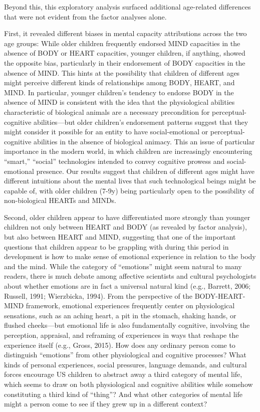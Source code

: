 \documentclass[10pt, letterpaper]{article}
\begin{document}
Beyond this, this exploratory analysis surfaced additional age-related
differences that were not evident from the factor analyses alone.

First, it revealed different biases in mental capacity attributions
across the two age groups: While older children frequently endorsed MIND
capacities in the absence of BODY or HEART capacities, younger children,
if anything, showed the opposite bias, particularly in their endorsement
of BODY capacities in the absence of MIND. This hints at the possibility
that children of different ages might perceive different kinds of
relationships among BODY, HEART, and MIND. In particular, younger
children's tendency to endorse BODY in the absence of MIND is consistent
with the idea that the physiological abilities characteristic of
biological animals are a necessary precondition for perceptual-cognitive
abilities---but older children's endorsement patterns suggest that they
might consider it possible for an entity to have social-emotional or
perceptual-cognitive abilities in the absence of biological animacy.
This an issue of particular importance in the modern world, in which
children are increasingly encountering ``smart,'' ``social''
technologies intended to convey cognitive prowess and social-emotional
presence. Our results suggest that children of different ages might have
different intuitions about the mental lives that such technological
beings might be capable of, with older children (7-9y) being
particularly open to the possibility of non-biological HEARTs and MINDs.

Second, older children appear to have differentiated more strongly than
younger children not only between HEART and BODY (as revealed by factor
analysis), but also between HEART and MIND, suggesting that one of the
important questions that children appear to be grappling with during
this period in development is how to make sense of emotional experience
in relation to the body and the mind. While the category of ``emotions''
might seem natural to many readers, there is much debate among affective
scientists and cultural psychologists about whether emotions are in fact
a universal natural kind (e.g., Barrett, 2006; Russell, 1991;
Wierzbicka, 1994). From the perspective of the BODY-HEART-MIND
framework, emotional experiences frequently center on physiological
sensations, such as an aching heart, a pit in the stomach, shaking
hands, or flushed cheeks---but emotional life is also fundamentally
cognitive, involving the perception, appraisal, and reframing of
experiences in ways that reshape the experience itself (e.g., Gross,
2015). How does any ordinary person come to distinguish ``emotions''
from other physiological and cognitive processes? What kinds of personal
experiences, social pressures, language demands, and cultural forces
encourage US children to abstract away a third category of mental life,
which seems to draw on both physiological and cognitive abilities while
somehow constituting a third kind of ``thing''? And what other
categories of mental life might a person come to see if they grew up in
a different context?
\end{document}

